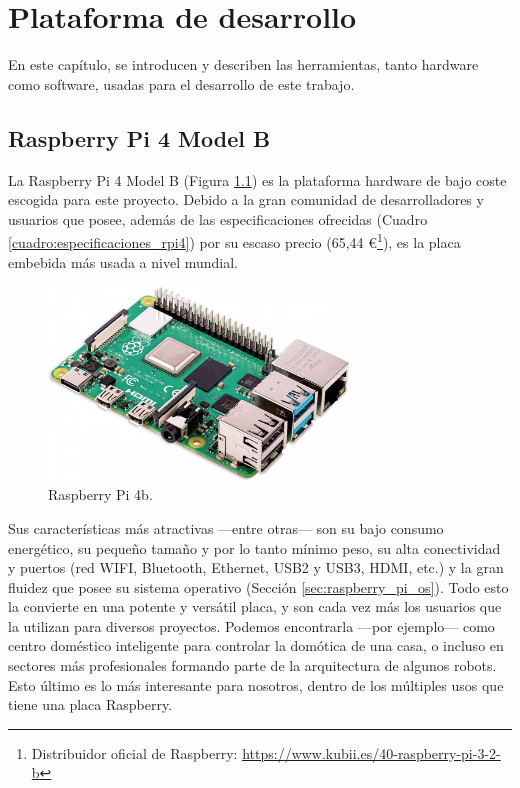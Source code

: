\chapter{Plataforma de desarrollo}
\label{cap:capitulo3}

En este capítulo, se introducen y describen las herramientas, tanto hardware como software, usadas para el desarrollo de este trabajo.

\section{Raspberry Pi 4 Model B}
\label{sec:rpi}

La Raspberry Pi 4 Model B (Figura \ref{fig:raspberry2}) es la plataforma hardware de bajo coste escogida para este proyecto. Debido a la gran comunidad de desarrolladores y usuarios que posee, además de las especificaciones ofrecidas (Cuadro \ref{cuadro:especificaciones_rpi4}) por su escaso precio (65,44 \euro\footnote{Distribuidor oficial de Raspberry: \url{https://www.kubii.es/40-raspberry-pi-3-2-b}}), es la placa embebida más usada a nivel mundial.\\

\begin{figure} [h!]
  \begin{center}
    \includegraphics[width=8cm]{figs/raspberry.jpg}
  \end{center}
  \caption{Raspberry Pi 4b.}
  \label{fig:raspberry2}
\end{figure}

Sus características más atractivas ---entre otras--- son su bajo consumo energético, su pequeño tamaño y por lo tanto mínimo peso, su alta conectividad y puertos (red WIFI, Bluetooth, Ethernet, USB2 y USB3, HDMI, etc.) y la gran fluidez que posee su sistema operativo (Sección \ref{sec:raspberry_pi_os}). Todo esto la convierte en una potente y versátil placa, y son cada vez más los usuarios que la utilizan para diversos proyectos. Podemos encontrarla ---por ejemplo--- como centro doméstico inteligente para controlar la domótica de una casa, o incluso en sectores más profesionales formando parte de la arquitectura de algunos robots. Esto último es lo más interesante para nosotros, dentro de los múltiples usos que tiene una placa Raspberry.\\


